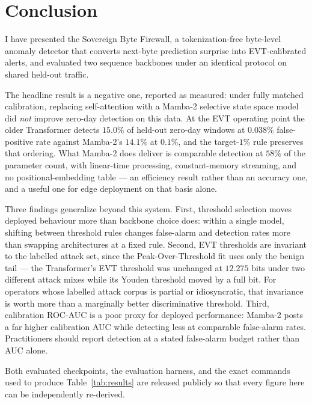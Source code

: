 \documentclass[10pt,journal,compsoc]{IEEEtran}
\begin{document}
\section{Conclusion}
I have presented the Sovereign Byte Firewall, a tokenization-free byte-level anomaly detector that converts next-byte prediction surprise into EVT-calibrated alerts, and evaluated two sequence backbones under an identical protocol on shared held-out traffic.

The headline result is a negative one, reported as measured: under fully matched calibration, replacing self-attention with a Mamba-2 selective state space model did \emph{not} improve zero-day detection on this data. At the EVT operating point the older Transformer detects $15.0\%$ of held-out zero-day windows at $0.038\%$ false-positive rate against Mamba-2's $14.1\%$ at $0.1\%$, and the target-$1\%$ rule preserves that ordering. What Mamba-2 does deliver is comparable detection at $58\%$ of the parameter count, with linear-time processing, constant-memory streaming, and no positional-embedding table --- an efficiency result rather than an accuracy one, and a useful one for edge deployment on that basis alone.

Three findings generalize beyond this system. First, threshold selection moves deployed behaviour more than backbone choice does: within a single model, shifting between threshold rules changes false-alarm and detection rates more than swapping architectures at a fixed rule. Second, EVT thresholds are invariant to the labelled attack set, since the Peak-Over-Threshold fit uses only the benign tail --- the Transformer's EVT threshold was unchanged at $12.275$ bits under two different attack mixes while its Youden threshold moved by a full bit. For operators whose labelled attack corpus is partial or idiosyncratic, that invariance is worth more than a marginally better discriminative threshold. Third, calibration ROC-AUC is a poor proxy for deployed performance: Mamba-2 posts a far higher calibration AUC while detecting less at comparable false-alarm rates. Practitioners should report detection at a stated false-alarm budget rather than AUC alone.

Both evaluated checkpoints, the evaluation harness, and the exact commands used to produce Table~\ref{tab:results} are released publicly so that every figure here can be independently re-derived.
\end{document}
